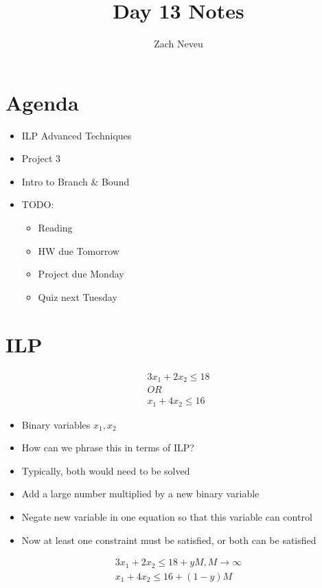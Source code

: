\documentclass[12pt, letter]{article}
\author{Zach Neveu}
\title{ Day 13 Notes }
\begin{document}
\maketitle

\section{Agenda}%
\label{sec:agenda}
\begin{itemize}
	\item ILP Advanced Techniques
	\item Project 3
	\item Intro to Branch \& Bound
	\item TODO:
	\begin{itemize}
		\item Reading
		\item HW due Tomorrow
		\item Project due Monday
		\item Quiz next Tuesday
	\end{itemize}
\end{itemize}

\section{ILP}%
\label{sec:ilp}
\begin{gather*}
3x_1+2x_2 \le 18 \\
OR \\
x_1+4x_2 \le 16
\end{gather*}
\begin{itemize}
    \item Binary variables $x_1, x_2$
	\item How can we phrase this in terms of ILP?
	\item Typically, both would need to be solved
	\item Add a large number multiplied by a new binary variable
	\item Negate new variable in one equation so that this variable can control
	\item Now at least one constraint must be satisfied, or both can be satisfied
\end{itemize}

\begin{gather*}
3x_1+2x_2 \le 18 + yM, M \rightarrow \infty \\
x_1+4x_2 \le 16 + (1-y)M
\end{gather*}
\end{document}
